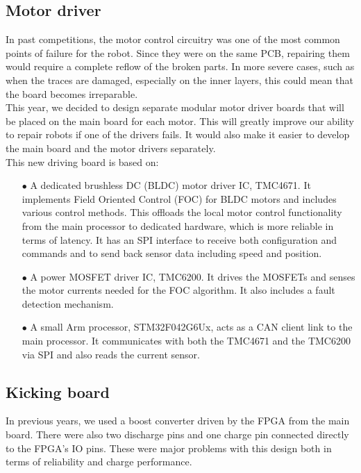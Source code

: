 \documentclass[runningheads]{llncs}
\begin{document}
\subsection{Motor driver}
In past competitions, the motor control circuitry was one of the most common points of failure for the robot. Since they were on the same PCB, repairing them would require a complete reflow of the broken parts. In more severe cases, such as when the traces are damaged, especially on the inner layers, this could mean that the board becomes irreparable.\\
This year, we decided to design separate modular motor driver boards that will be placed on the main board for each motor. This will greatly improve our ability to repair robots if one of the drivers fails. It would also make it easier to develop the main board and the motor drivers separately.\\
This new driving board is based on:
\begin{enumerate}
    \item[$\bullet$] A dedicated brushless DC (BLDC) motor driver IC, TMC4671. It implements Field Oriented Control (FOC) for BLDC motors and includes various control methods. This offloads the local motor control functionality from the main processor to dedicated hardware, which is more reliable in terms of latency. It has an SPI interface to receive both configuration and commands and to send back sensor data including speed and position.
    \item[$\bullet$] A power MOSFET driver IC, TMC6200. It drives the MOSFETs and senses the motor currents needed for the FOC algorithm. It also includes a fault detection mechanism.
    \item[$\bullet$] A small Arm processor, STM32F042G6Ux, acts as a CAN client link to the main processor. It communicates with both the TMC4671 and the TMC6200 via SPI and also reads the current sensor.
\end{enumerate}

\subsection{Kicking board}
In previous years, we used a boost converter driven by the FPGA from the main board. There were also two discharge pins and one charge pin connected directly to the FPGA's IO pins. These were major problems with this design both in terms of reliability and charge performance.\\
\end{document}
